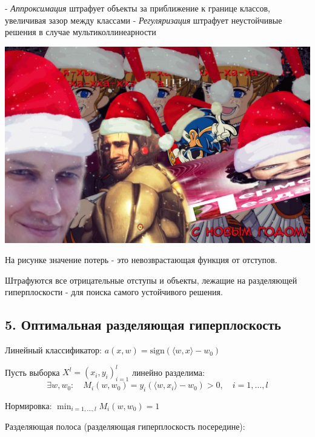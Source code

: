 - \textit{Аппроксимация} штрафует объекты за приближение к границе классов,
увеличивая зазор между классами
- \textit{Регуляризация} штрафует неустойчивые решения в случае
мультиколлинеарности

\includegraphics[scale=0.3]{figures/samplefigure.jpg}

На рисунке значение потерь - это невозврастающая функция от отступов.

Штрафуются все отрицательные отступы и объекты, лежащие на разделяющей
гиперплоскости - для поиска самого устойчивого решения.

\subsection{5. Оптимальная разделяющая гиперплоскость}

Линейный классификатор:
$a{(x, w)} = \text{sign}{\left( {\langle w, x \rangle} - w_0 \right)}$

Пусть выборка $X^l = {(x_i, y_i)}^l_{i=1}$ линейно разделима:
$$\exists w, w_0 : \quad M_i{(w, w_0)} = y_i{\left( {\langle w, x_i \rangle} - w_0 \right)} > 0, \quad i = 1, \ldots, l$$

Нормировка: $\displaystyle \min_{i=1,\ldots,l}{M_i{(w, w_0)}} = 1$

Разделяющая полоса (разделяющая гиперплоскость посередине):


